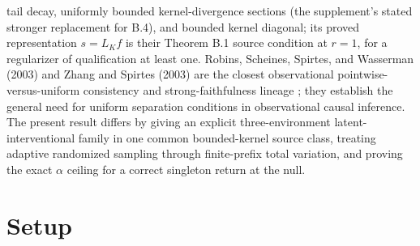 \documentclass{article}
\begin{document}
tail decay, uniformly bounded kernel-divergence sections (the supplement's stated stronger replacement for B.4), and bounded kernel diagonal; its proved representation \(s=L_Kf\) is their Theorem B.1 source condition at \(r=1\), for a regularizer of qualification at least one. Robins, Scheines, Spirtes, and Wasserman (2003) and Zhang and Spirtes (2003) are the closest observational pointwise-versus-uniform consistency and strong-faithfulness lineage \cite{robins2003uniform,zhang2003strong}; they establish the general need for uniform separation conditions in observational causal inference. The present result differs by giving an explicit three-environment latent-interventional family in one common bounded-kernel source class, treating adaptive randomized sampling through finite-prefix total variation, and proving the exact \(\alpha\) ceiling for a correct singleton return at the null.

\section{Setup}
\end{document}
